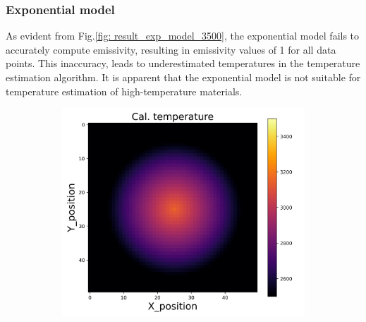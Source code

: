 \subsubsection{Exponential model}
As evident from Fig.\ref{fig: result_exp_model_3500}, the exponential model fails to accurately 
compute emissivity, resulting in emissivity values of 1 for all data points. 
This inaccuracy, leads to underestimated temperatures in the temperature estimation 
algorithm. It is apparent that the exponential model is not suitable for temperature 
estimation of high-temperature materials.



\begin{figure}[htbp]
    \centering
    \begin{minipage}{\textwidth}
        \centering
        \begin{subfigure}{0.325\textwidth}
            \centering
            \includegraphics[width=\textwidth]{figures/raw_data/21/T3500/exp/T_cal.jpg}
        \end{subfigure}
        \begin{subfigure}{0.325\textwidth}
            \centering

\end{subfigure}
\end{minipage}
\end{figure}
